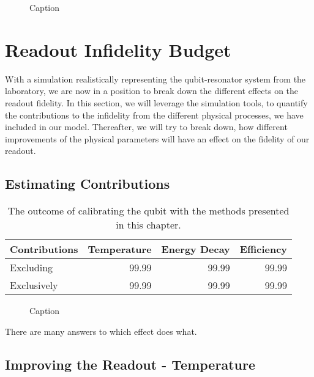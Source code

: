 \begin{figure*}
    \centering
    \caption{Caption}
    \label{fig:enter-label}
\end{figure*}



\chapter{Readout Infidelity Budget}
With a simulation realistically representing the qubit-resonator system from the laboratory, we are now in a position to break down the different effects on the readout fidelity. In this section, we will leverage the simulation tools, to quantify the contributions to the infidelity from the different physical processes, we have included in our model. Thereafter, we will try to break down, how different improvements of the physical parameters will have an effect on the fidelity of our readout. 

\section{Estimating Contributions}


\begin{table}[h]
\centering
\caption{The outcome of calibrating the qubit with the methods presented in this chapter.}
\begin{tabular}{l|rrr}
\hline
\textbf{Contributions}        & Temperature              & Energy Decay   & Efficiency  \\ \hline
Excluding                     &  99.99          &  99.99 &  99.99 \\
Exclusively                   &  99.99          &  99.99 &  99.99
\end{tabular}
\label{tab:readout_infidelity_contribution_estimation}
\end{table}

\begin{figure*}
    \centering
    \caption{Caption}
    \label{fig:enter-label}
\end{figure*}

There are many answers to which effect does what.

\section{Improving the Readout - Temperature}

